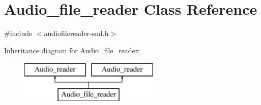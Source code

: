 \hypertarget{class_audio__file__reader}{}\section{Audio\+\_\+file\+\_\+reader Class Reference}
\label{class_audio__file__reader}


{\ttfamily \#include $<$audiofilereader-\/snd.\+h$>$}

Inheritance diagram for Audio\+\_\+file\+\_\+reader\+:\begin{figure}[H]
\begin{center}
\leavevmode
\includegraphics[height=2.000000cm]{class_audio__file__reader}
\end{center}
\end{figure}
